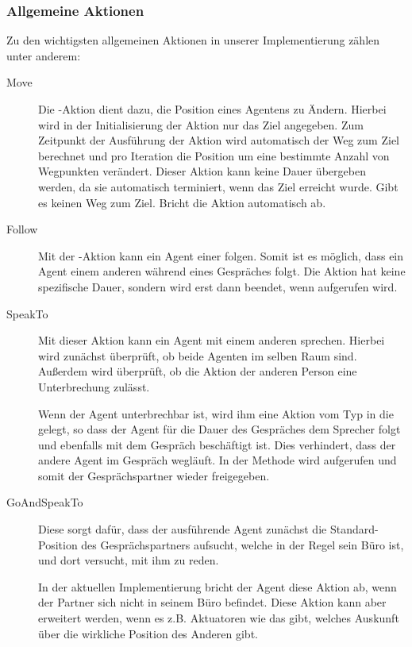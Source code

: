 \subsubsection{Allgemeine Aktionen}
Zu den wichtigsten allgemeinen Aktionen in unserer Implementierung zählen unter anderem:
\begin{description}
	\item[Move] Die -Aktion dient dazu, die Position eines Agentens zu Ändern. Hierbei wird in der Initialisierung der Aktion nur das Ziel angegeben. Zum Zeitpunkt der Ausführung der Aktion wird automatisch der Weg zum Ziel berechnet und pro Iteration die Position um eine bestimmte Anzahl von Wegpunkten verändert. Dieser Aktion kann keine Dauer übergeben werden, da sie automatisch terminiert, wenn das Ziel erreicht wurde. Gibt es keinen Weg zum Ziel. Bricht die Aktion automatisch ab.
	\item[Follow] Mit der -Aktion kann ein Agent einer    folgen. Somit ist es möglich, dass ein Agent einem anderen während eines Gespräches folgt. Die Aktion hat keine spezifische Dauer, sondern wird erst dann beendet, wenn  aufgerufen wird.
	\item[SpeakTo] Mit dieser Aktion kann ein Agent mit einem anderen sprechen. Hierbei wird zunächst überprüft, ob beide Agenten im selben Raum sind. Außerdem wird überprüft, ob die Aktion der anderen Person eine Unterbrechung zulässt.
	
	Wenn der Agent unterbrechbar ist, wird ihm eine Aktion vom Typ  in die  gelegt, so dass der Agent für die Dauer des Gespräches dem Sprecher folgt und ebenfalls mit dem Gespräch beschäftigt ist. Dies verhindert, dass der andere Agent im Gespräch wegläuft. In der Methode  wird  aufgerufen und somit der Gesprächspartner wieder freigegeben.
	\item[GoAndSpeakTo] Diese  sorgt dafür, dass der ausführende Agent zunächst die Standard-Position des Gesprächspartners aufsucht, welche in der Regel sein Büro ist, und dort versucht, mit ihm zu reden. 
	
	In der aktuellen Implementierung bricht der Agent diese Aktion ab, wenn der Partner sich nicht in seinem Büro befindet. Diese Aktion kann aber erweitert werden, wenn es z.B. Aktuatoren wie das  gibt, welches Auskunft über die wirkliche Position des Anderen gibt.
\end{description}
